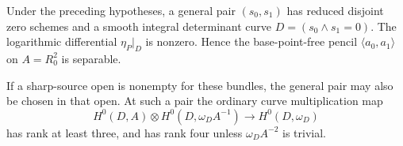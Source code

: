 \begin{proposition}
\label{prop:DE-A3-positive-smooth-separable-pencil}
Under the preceding hypotheses, a general pair $(s_0,s_1)$ has
reduced disjoint zero schemes and a smooth integral determinant
curve $D=(s_0\wedge s_1=0)$. The logarithmic differential
$\eta_P|_D$ is nonzero. Hence the base-point-free pencil
$\langle a_0,a_1\rangle$ on $A=R_0^2$ is separable.

If a sharp-source open is nonempty for these bundles, the general
pair may also be chosen in that open. At such a pair the ordinary
curve multiplication map
\[
 H^0(D,A)\otimes H^0(D,\omega_D A^{-1})
       \longrightarrow H^0(D,\omega_D)
                                                        \tag{DE-SJ2}
\]
has rank at least three, and has rank four unless
$\omega_D A^{-2}$ is trivial.
\end{proposition}
